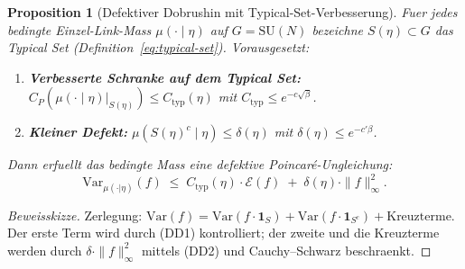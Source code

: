 \documentclass[12pt,a4paper]{article}
\theoremstyle{definition}
\theoremstyle{plain}
\newtheorem{proposition}[definition]{Proposition}
\theoremstyle{remark}
\begin{document}

\begin{proposition}[Defektiver Dobrushin mit Typical-Set-Verbesserung]\label{prop:defective-dobrushin}
Fuer jedes bedingte Einzel-Link-Mass $\mu(\cdot \mid \eta)$ auf $G = \mathrm{SU}(N)$ bezeichne $S(\eta) \subset G$ das Typical Set (Definition~\ref{eq:typical-set}). Vorausgesetzt:
\begin{enumerate}
\item[\textup{(DD1)}] \textbf{Verbesserte Schranke auf dem Typical Set:} $C_P(\mu(\cdot \mid \eta)|_{S(\eta)}) \leq C_{\mathrm{typ}}(\eta)$ mit $C_{\mathrm{typ}} \leq e^{-c\sqrt{\beta}}$.
\item[\textup{(DD2)}] \textbf{Kleiner Defekt:} $\mu(S(\eta)^c \mid \eta) \leq \delta(\eta)$ mit $\delta(\eta) \leq e^{-c'\beta}$.
\end{enumerate}
Dann erfuellt das bedingte Mass eine \emph{defektive Poincar\'e-Ungleichung}:
\begin{equation}\label{eq:defective-poincare}
  \mathrm{Var}_{\mu(\cdot|\eta)}(f) \;\leq\; C_{\mathrm{typ}}(\eta) \cdot \mathcal{E}(f) \;+\; \delta(\eta) \cdot \|f\|_\infty^2.
\end{equation}
\end{proposition}

\begin{proof}[Beweisskizze]
Zerlegung: $\mathrm{Var}(f) = \mathrm{Var}(f \cdot \mathbf{1}_S) + \mathrm{Var}(f \cdot \mathbf{1}_{S^c}) + \text{Kreuzterme}$. Der erste Term wird durch (DD1) kontrolliert; der zweite und die Kreuzterme werden durch $\delta \cdot \|f\|_\infty^2$ mittels (DD2) und Cauchy--Schwarz beschraenkt.
\end{proof}
\end{document}
